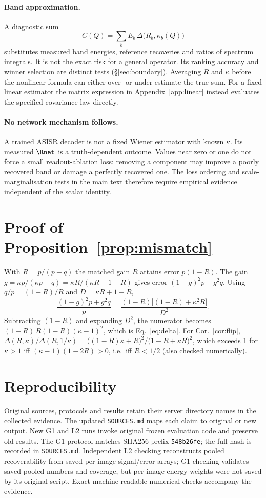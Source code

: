 \paragraph{Band approximation.} A diagnostic sum
\begin{equation}\label{eq:crit}
C(Q)=\sum_b E_b\,\Delta\big(R_b,\kappa_b(Q)\big)
\end{equation}
substitutes measured band energies, reference recoveries and ratios of spectrum integrals. It is not the exact risk for a general operator. Its ranking accuracy and winner selection are distinct tests (\S\ref{sec:boundary}). Averaging $R$ and $\kappa$ before the nonlinear formula can either over- or under-estimate the true sum. For a fixed linear estimator the matrix expression in Appendix~\ref{app:linear} instead evaluates the specified covariance law directly.

\paragraph{No network mechanism follows.} A trained ASISR decoder is not a fixed Wiener estimator with known $\kappa$. Its measured $\Rnet$ is a truth-dependent outcome. Values near zero or one do not force a small readout-ablation loss: removing a component may improve a poorly recovered band or damage a perfectly recovered one. The loss ordering and scale-marginalisation tests in the main text therefore require empirical evidence independent of the scalar identity.

\section{Proof of Proposition~\ref{prop:mismatch}}\label{app:proof}
With $R=p/(p+q)$ the matched gain $R$ attains error $p(1-R)$. The gain
$g=\kappa p/(\kappa p+q)=\kappa R/(\kappa R+1-R)$ gives error
$(1-g)^2p+g^2q$. Using $q/p=(1-R)/R$ and $D=\kappa R+1-R$,
\[
\frac{(1-g)^2p+g^2q}{p}=\frac{(1-R)\big[(1-R)+\kappa^2R\big]}{D^2}.
\]
Subtracting $(1-R)$ and expanding $D^2$, the numerator becomes
$(1-R)\,R(1-R)(\kappa-1)^2$, which is Eq.~\eqref{eq:delta}.
For Cor.~\ref{cor:flip},
$\Delta(R,\kappa)/\Delta(R,1/\kappa)=\big((1-R)\kappa+R\big)^2/\big(1-R+\kappa R\big)^2$,
which exceeds 1 for $\kappa>1$ iff $(\kappa-1)(1-2R)>0$, i.e.\ iff $R<1/2$
(also checked numerically).

\section{Reproducibility}
Original sources, protocols and results retain their server directory
names in the collected evidence. The updated \texttt{SOURCES.md} maps each
claim to original or new output. New G1 and L2 runs invoke original frozen
evaluation code and preserve old results. The G1 protocol matches SHA256
prefix \texttt{548b26fe}; the full hash is recorded in \texttt{SOURCES.md}.
Independent L2 checking reconstructs pooled recoverability from saved
per-image signal/error arrays; G1 checking validates saved pooled numbers
and coverage, but per-image energy weights were not saved by its original
script. Exact machine-readable numerical checks accompany the evidence.

